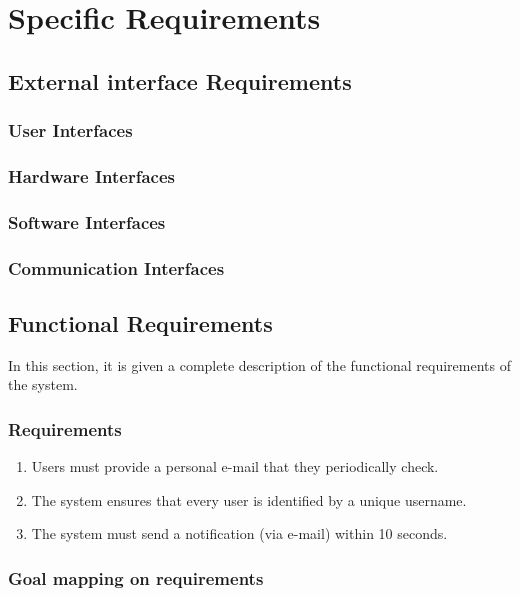 \chapter{Specific Requirements}

\section{External interface Requirements}
\subsection{User Interfaces}
\subsection{Hardware Interfaces}
\subsection{Software Interfaces}
\subsection{Communication Interfaces}

\section{Functional Requirements}
In this section, it is given a complete description of the functional requirements of the system.

    \subsection{Requirements}
        \begin{enumerate}[series=requirements, label=\textbf{R.\arabic*}]
            \item Users must provide a personal e-mail that they periodically check.
            \item The system ensures that every user is identified by a unique username.
            \item The system must send a notification (via e-mail) within 10 seconds.
        \end{enumerate}

    \subsection{Goal mapping on requirements}

